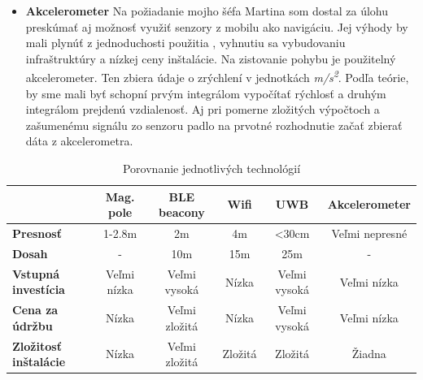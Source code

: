 \documentclass[11pt, oneside]{report}
\begin{document}
\begin{itemize}
\item\textbf{Akcelerometer} Na požiadanie mojho šéfa Martina som dostal za úlohu preskúmať  aj  možnosť využiť   senzory z mobilu ako navigáciu. Jej výhody by mali plynúť z jednoduchosti použitia , vyhnutiu sa vybudovaniu infraštruktúry  a nízkej ceny inštalácie. Na zistovanie pohybu   je použitelný  akcelerometer. Ten zbiera údaje o zrýchlení v jednotkách \textit{m/s\textsuperscript{2}}. Podľa teórie, by sme mali byť schopní prvým integrálom vypočítať rýchlosť a druhým integrálom prejdenú vzdialenosť. Aj pri pomerne zložitých výpočtoch a zašumenému signálu zo senzoru padlo na prvotné rozhodnutie  začať zbierať dáta z akcelerometra.
\end{itemize}

\begin{table}[htb]
\centering
\label{tab}
\begin{tabular}{|l|c|c|c|c|c|}
\hline
                              & \textbf{Mag. pole} & \textbf{BLE beacony} & \textbf{Wifi} & \textbf{UWB}  & \textbf{Akcelerometer} \\ \hline
\textbf{Presnosť}             & 1-2.8m                        & 2m                         & 4m            & \textless30cm & Veľmi nepresné            \\ \hline
\textbf{Dosah}                & -                             & 10m                        & 15m           & 25m           & -                         \\ \hline
\textbf{Vstupná investícia}   & Veľmi nízka                   & Veľmi vysoká               & Nízka         & Veľmi vysoká  & Veľmi nízka               \\ \hline
\textbf{Cena za údržbu}       & Nízka                         & Veľmi zložitá              & Nízka         & Veľmi vysoká  & Veľmi nízka               \\ \hline
\textbf{Zložitosť inštalácie} & Nízka                         & Veľmi zložitá              & Zložitá       & Zložitá       & Žiadna                    \\ \hline
\end{tabular}
\caption{Porovnanie  jednotlivých technológií}
\end{table}
\end{document}
